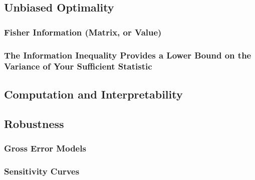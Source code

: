 	\subsection{Unbiased Optimality}

		\subsubsection{Fisher Information (Matrix, or Value)}

		\subsubsection{The Information Inequality Provides a Lower Bound on the Variance of Your Sufficient Statistic}

	\subsection{Computation and Interpretability}

	\subsection{Robustness}

		\subsubsection{Gross Error Models}

		\subsubsection{Sensitivity Curves}
